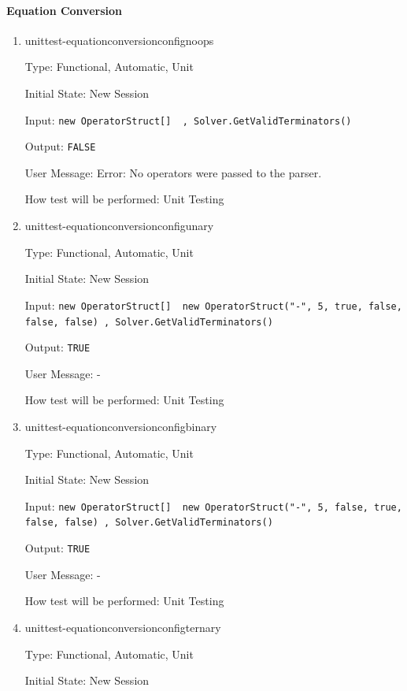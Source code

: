 \documentclass[12pt, titlepage]{article}
\begin{document}
\paragraph{Equation Conversion}
\begin{enumerate}
	
	\item{unittest-equationconversionconfignoops}
	
	Type: Functional, Automatic, Unit
	
	Initial State: New Session
	
	Input: \texttt{new OperatorStruct[] { }, Solver.GetValidTerminators()}
	
	Output: \texttt{FALSE}
	
	User Message: Error: No operators were passed to the parser.
	
	How test will be performed: Unit Testing\\
	
	\item{unittest-equationconversionconfigunary}
	
	Type: Functional, Automatic, Unit
	
	Initial State: New Session
	
	Input: \texttt{new OperatorStruct[] { new OperatorStruct("-", 5, true, 
	false, false, false) }, Solver.GetValidTerminators()}
	
	Output: \texttt{TRUE}
	
	User Message: -
	
	How test will be performed: Unit Testing\\
	
	\item{unittest-equationconversionconfigbinary}
	
	Type: Functional, Automatic, Unit
	
	Initial State: New Session
	
	Input: \texttt{new OperatorStruct[] { new OperatorStruct("-", 5, false, 
			true, false, false) }, Solver.GetValidTerminators()}
	
	Output: \texttt{TRUE}
	
	User Message: -
	
	How test will be performed: Unit Testing\\
	
	\item{unittest-equationconversionconfigternary}
	
	Type: Functional, Automatic, Unit
	
	Initial State: New Session
	

\end{enumerate}
\end{document}
